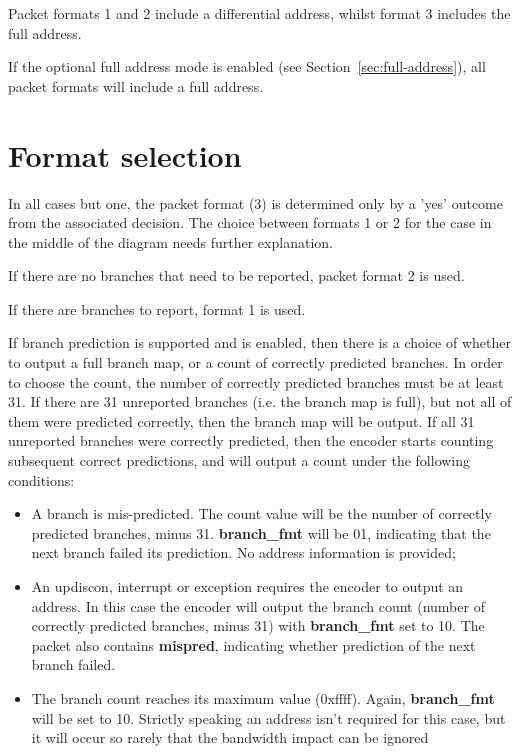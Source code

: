 Packet formats 1 and 2 include a differential address, whilst format 3 includes the full address.

If the optional full address mode is enabled (see Section~\ref{sec:full-address}), all packet formats
will include a full address.

\section{Format selection} \label{format-selection}

In all cases but one, the packet format (3) is determined only by a 'yes' outcome from the 
associated decision.  The choice between formats 1 or 2 for the case in the middle of the 
diagram needs further explanation.  

If there are no branches that need to be reported, packet format 2 is used.  

If there are branches to report, format 1 is used.

If branch prediction is supported and is enabled, then there is a choice of whether to output a 
full branch map, or a count of correctly predicted branches.  In order to choose the count, the number 
of correctly predicted branches must be at least 31.  If there are 31 unreported branches (i.e. the branch
map is full), but not all of them were predicted correctly, then the branch map will be output.
If all 31 unreported branches were correctly predicted, then the encoder starts counting
subsequent correct predictions, and will output a count under the following conditions:

\begin{itemize}
  \item A branch is mis-predicted.  The count value will be the number of correctly predicted branches, 
    minus 31.  \textbf{branch\_fmt} will be 01, indicating that the next branch failed its prediction.
   No address information is provided;
  \item An updiscon, interrupt or exception requires the encoder to output an address.  In this case 
    the encoder will output the branch count (number of correctly predicted branches, minus 31) with 
    \textbf{branch\_fmt} set to 10.  The packet also contains \textbf{mispred}, indicating whether 
    prediction of the next branch failed.
  \item The branch count reaches its maximum value (0xffff).  Again, \textbf{branch\_fmt} will be set to 10.
    Strictly speaking an address isn't required for this case, but it will occur so rarely that the bandwidth 
    impact can be ignored
\end{itemize}

